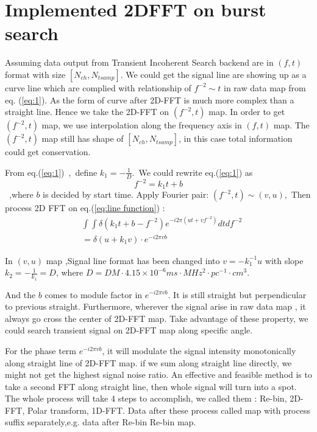 \documentclass[twocolumn]{aastex61}
\begin{document}
\section{Implemented 2DFFT on burst search}
Assuming data output from Transient Incoherent Search backend are in $(f,t)$ format with size $[N_{ch},N_{tsamp}]$. We could get the signal line are showing up as a curve line which are complied with relationship of $f^{-2}\sim t$ in raw data map from eq. (\ref{eq:1}). As the form of curve after 2D-FFT is much more complex than a straight line. Hence we take the 2D-FFT on $(f^{-2},t)$ map. In order to get $(f^{-2},t)$ map, we use interpolation along the frequency axis in $(f,t)$ map. The $(f^{-2},t)$ map still has shape of $[N_{ch},N_{tsamp}]$\label{rebin_shape}, in this case total information could get conservation.

From eq.(\ref{eq:1})~,~define $k_1 =- \frac{1}{D} $.~We could rewrite eq.(\ref{eq:1}) as 
\begin{equation}
f^{-2}=k_1t +b\label{eq:line function}
\end{equation}
~,where $b$ is decided by start time. Apply Fourier pair:
$(f^{-2},t) \sim (v,u)$,~Then process 2D FFT on eq.(\ref{eq:line function}) :
\begin{equation} \begin{aligned}
&\int\int\delta(k_1t+b-f^{-2})e^{-i2\pi(ut+vf^{-2})}dtdf^{-2}
\\ &=\delta(u+k_1v)\cdot e^{-i2\pi vb}
\end{aligned}
\end{equation}

In $(v,u)$ map ,Signal line format has been changed into $v=-k_1^{-1} u$ with slope $k_2 =-\frac{1}{k_1}=D$, where $D=DM\cdot4.15 \times 10^{-6} ms \cdot MHz^2 \cdot pc^{-1} \cdot cm^3$. 

And the $b$ comes to module factor in $e^{-i2\pi vb}$. It is still straight but perpendicular to previous straight. Furthermore,  wherever the signal arise in raw data map , it always go cross the center of 2D-FFT map. Take advantage of these property, we could search transient signal on 2D-FFT map along specific angle. 

For the phase term $e^{-i2\pi vb}$, it will modulate the signal intensity monotonically along straight line of 2D-FFT map. if we sum along straight line directly, we might not get the highest signal noise ratio. An effective and feasible method is to take a second FFT along straight line, then whole signal will turn into a spot. The whole process will take 4 steps to accomplish, we called them : Re-bin, 2D-FFT, Polar transform, 1D-FFT. Data after these process called map with process suffix separately,e.g. data after Re-bin  Re-bin map.
\end{document}
